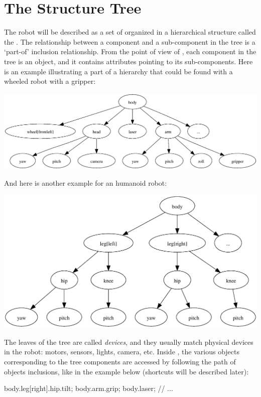\section{The Structure Tree}

The robot will be described as a set of 
organized in a hierarchical structure called the . The
relationship between a component and a sub-component in the tree is a
`part-of' inclusion relationship. From the point of view of \urbi, each
component in the tree is an object, and it contains attributes pointing to
its sub-components. Here is an example illustrating a part of a hierarchy
that could be found with a wheeled robot with a gripper:

\begin{center}
  \includegraphics[width=.8\linewidth]{img/structure-tree-wheeled}
\end{center}

And here is another example for an humanoid robot:

\begin{center}
  \includegraphics[width=.8\linewidth]{img/structure-tree-humanoid}
\end{center}

The leaves of the tree are called \textit{devices}, and they usually
match physical devices in the robot: motors, sensors, lights, camera,
etc. Inside \urbi, the various objects corresponding to the tree
components are accessed by following the path of objects inclusions,
like in the example below (shortcuts will be described later):

\begin{urbiunchecked}
body.leg[right].hip.tilt;
body.arm.grip;
body.laser;
// ...
\end{urbiunchecked}


